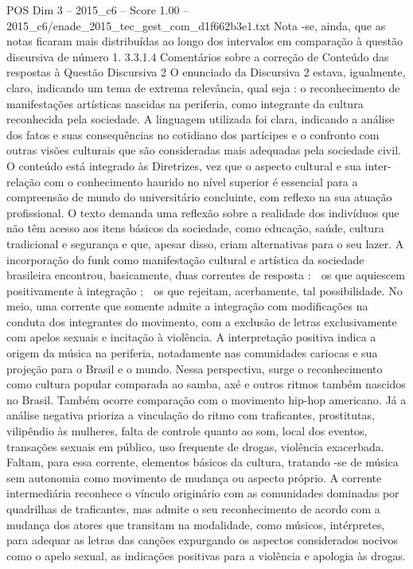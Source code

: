 \begin{textsample}{POS Dim 3 – 2015\_c6 – Score 1.00 – 2015\_c6/enade\_2015\_tec\_gest\_com\_d1f662b3e1.txt}
Nota -se, ainda, que as notas ficaram mais distribuídas ao longo dos intervalos em comparação à questão discursiva de número 1. 3.3.1.4 Comentários sobre a correção de Conteúdo das respostas à Questão Discursiva 2 O enunciado da Discursiva 2 estava, igualmente, claro, indicando um tema de extrema relevância, qual seja : o reconhecimento de manifestações artísticas nascidas na periferia, como integrante da cultura reconhecida pela sociedade.
A linguagem utilizada foi clara, indicando a análise dos fatos e suas consequências no cotidiano dos partícipes e o confronto com outras visões culturais que são consideradas mais adequadas pela sociedade civil.
O conteúdo está integrado às Diretrizes, vez que o aspecto cultural e sua inter-relação com o conhecimento haurido no nível superior é essencial para a compreensão de mundo do universitário concluinte, com reflexo na sua atuação profissional.
O texto demanda uma reflexão sobre a realidade dos indivíduos que não têm acesso aos itens básicos da sociedade, como educação, saúde, cultura tradicional e segurança e que, apesar disso, criam alternativas para o seu lazer.
A incorporação do funk como manifestação cultural e artística da sociedade brasileira encontrou, basicamente, duas correntes de resposta :  os que aquiescem positivamente à integração ;  os que rejeitam, acerbamente, tal possibilidade.
No meio, uma corrente que somente admite a integração com modificações na conduta dos integrantes do movimento, com a exclusão de letras exclusivamente com apelos sexuais e incitação à violência.
A interpretação positiva indica a origem da música na periferia, notadamente nas comunidades cariocas e sua projeção para o Brasil e o mundo.
Nessa perspectiva, surge o reconhecimento como cultura popular comparada ao samba, axé e outros ritmos também nascidos no Brasil.
Também ocorre comparação com o movimento hip-hop americano.
Já a análise negativa prioriza a vinculação do ritmo com traficantes, prostitutas, vilipêndio às mulheres, falta de controle quanto ao som, local dos eventos, transações sexuais em público, uso frequente de drogas, violência exacerbada.
Faltam, para essa corrente, elementos básicos da cultura, tratando -se de música sem autonomia como movimento de mudança ou aspecto próprio.
A corrente intermediária reconhece o vínculo originário com as comunidades dominadas por quadrilhas de traficantes, mas admite o seu reconhecimento de acordo com a mudança dos atores que transitam na modalidade, como músicos, intérpretes, para adequar as letras das canções expurgando os aspectos considerados nocivos como o apelo sexual, as indicações positivas para a violência e apologia às drogas.

\end{textsample}
